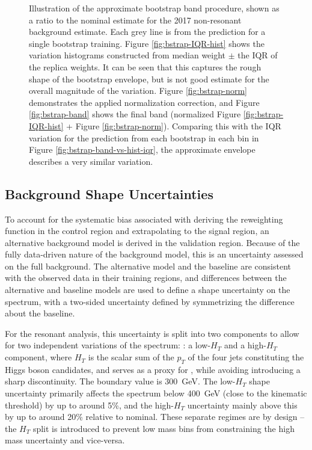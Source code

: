 \begin{figure}[ht]
	\caption{Illustration of the approximate bootstrap band procedure, shown as a ratio to the nominal estimate 
	for the 2017 non-resonant background estimate. Each grey line is from the \mhh prediction for a 
	single bootstrap training. Figure \ref{fig:bstrap-IQR-hist} shows 
	the variation histograms constructed from median weight $\pm$ the IQR of the replica weights. It can be seen 
	that this captures the rough shape of the bootstrap envelope, but is not good estimate for the overall magnitude
	of the variation. Figure \ref{fig:bstrap-norm} demonstrates the applied normalization correction, and Figure 
	\ref{fig:bstrap-band} shows the final band (normalized Figure \ref{fig:bstrap-IQR-hist} + 
	Figure \ref{fig:bstrap-norm}). Comparing this with the IQR variation for the prediction from each bootstrap 
	in each bin in Figure \ref{fig:bstrap-band-vs-hist-iqr}, the approximate envelope describes a very similar variation.}
	\label{fig:bootstrap-breakdown}
\end{figure}

\FloatBarrier
\subsection{Background Shape Uncertainties}
To account for the systematic bias associated with deriving the reweighting function
in the control region and extrapolating to the signal region, an alternative background
model is derived in the validation region. Because of the fully data-driven nature of the 
background model, this is an uncertainty assessed on the full background. The alternative model 
and the baseline are consistent with the observed data in their training regions, and 
differences between the alternative and baseline models are used to define a shape uncertainty on the \mhh
spectrum, with a two-sided uncertainty defined by symmetrizing the difference about
the baseline.

For the resonant analysis, this uncertainty is split into two components to allow for two 
independent variations of the \mhh spectrum: : a low-$H_{T}$ and a high-$H_{T}$ component,
where $H_{T}$ is the scalar sum of the $p_{T}$ of the four jets constituting the
Higgs boson candidates, and serves as a proxy for \mhh, while avoiding
introducing a sharp discontinuity. The boundary value is \SI{300}{\GeV}. The
low-$H_{T}$ shape uncertainty primarily affects the \mhh spectrum below
\SI{400}{\GeV} (close to the kinematic threshold) by up to around 5\%, and the
high-$H_{T}$ uncertainty mainly \mhh above this by up to around 20\% relative to
nominal. These separate \mhh regimes are by design -- the $H_{T}$ split is 
introduced to prevent low mass bins from constraining the high mass uncertainty 
and vice-versa. 

